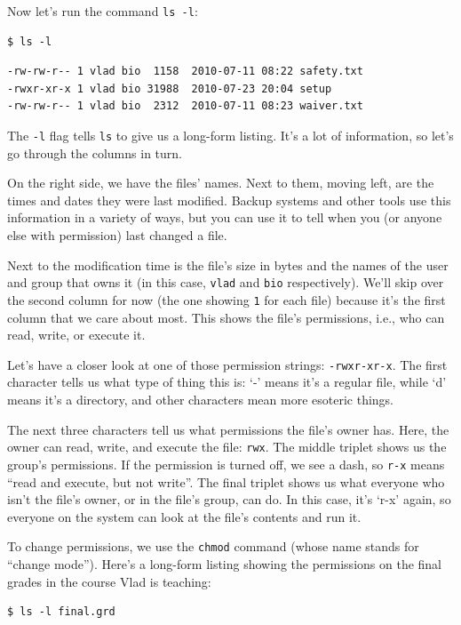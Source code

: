 \documentclass{book}
\begin{document}
Now let's run the command \texttt{ls -l}:

\begin{verbatim}
$ ls -l
\end{verbatim}

\begin{verbatim}
-rw-rw-r-- 1 vlad bio  1158  2010-07-11 08:22 safety.txt
-rwxr-xr-x 1 vlad bio 31988  2010-07-23 20:04 setup
-rw-rw-r-- 1 vlad bio  2312  2010-07-11 08:23 waiver.txt
\end{verbatim}

The \texttt{-l} flag tells \texttt{ls} to give us a long-form listing.
It's a lot of information, so let's go through the columns in turn.

On the right side, we have the files' names. Next to them, moving left,
are the times and dates they were last modified. Backup systems and
other tools use this information in a variety of ways, but you can use
it to tell when you (or anyone else with permission) last changed a
file.

Next to the modification time is the file's size in bytes and the names
of the user and group that owns it (in this case, \texttt{vlad} and
\texttt{bio} respectively). We'll skip over the second column for now
(the one showing \texttt{1} for each file) because it's the first column
that we care about most. This shows the file's permissions, i.e., who
can read, write, or execute it.

Let's have a closer look at one of those permission strings:
\texttt{-rwxr-xr-x}. The first character tells us what type of thing
this is: `-' means it's a regular file, while `d' means it's a
directory, and other characters mean more esoteric things.

The next three characters tell us what permissions the file's owner has.
Here, the owner can read, write, and execute the file: \texttt{rwx}. The
middle triplet shows us the group's permissions. If the permission is
turned off, we see a dash, so \texttt{r-x} means ``read and execute, but
not write''. The final triplet shows us what everyone who isn't the
file's owner, or in the file's group, can do. In this case, it's `r-x'
again, so everyone on the system can look at the file's contents and run
it.

To change permissions, we use the \texttt{chmod} command (whose name
stands for ``change mode''). Here's a long-form listing showing the
permissions on the final grades in the course Vlad is teaching:

\begin{verbatim}
$ ls -l final.grd
\end{verbatim}
\end{document}
